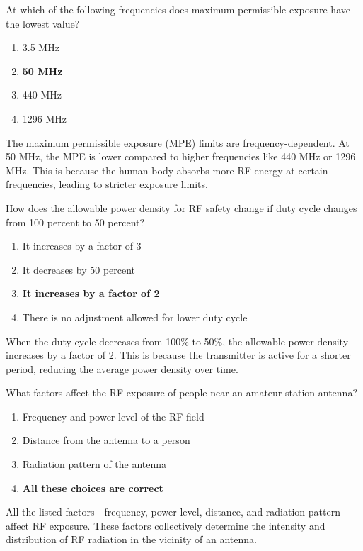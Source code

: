 
\begin{tcolorbox}[colback=gray!10!white,colframe=black!75!black,title={T0C02}]
At which of the following frequencies does maximum permissible exposure have the lowest value?
\begin{enumerate}[label=\Alph*,noitemsep]
    \item 3.5 MHz
    \item \textbf{50 MHz}
    \item 440 MHz
    \item 1296 MHz
\end{enumerate}
\end{tcolorbox}
The maximum permissible exposure (MPE) limits are frequency-dependent. At 50 MHz, the MPE is lower compared to higher frequencies like 440 MHz or 1296 MHz. This is because the human body absorbs more RF energy at certain frequencies, leading to stricter exposure limits.


\begin{tcolorbox}[colback=gray!10!white,colframe=black!75!black,title={T0C03}]
How does the allowable power density for RF safety change if duty cycle changes from 100 percent to 50 percent?
\begin{enumerate}[label=\Alph*,noitemsep]
    \item It increases by a factor of 3
    \item It decreases by 50 percent
    \item \textbf{It increases by a factor of 2}
    \item There is no adjustment allowed for lower duty cycle
\end{enumerate}
\end{tcolorbox}
When the duty cycle decreases from 100\% to 50\%, the allowable power density increases by a factor of 2. This is because the transmitter is active for a shorter period, reducing the average power density over time.


\begin{tcolorbox}[colback=gray!10!white,colframe=black!75!black,title={T0C04}]
What factors affect the RF exposure of people near an amateur station antenna?
\begin{enumerate}[label=\Alph*,noitemsep]
    \item Frequency and power level of the RF field
    \item Distance from the antenna to a person
    \item Radiation pattern of the antenna
    \item \textbf{All these choices are correct}
\end{enumerate}
\end{tcolorbox}
All the listed factors—frequency, power level, distance, and radiation pattern—affect RF exposure. These factors collectively determine the intensity and distribution of RF radiation in the vicinity of an antenna.

